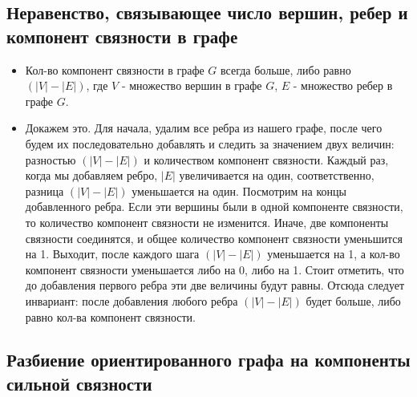 \subsection{Неравенство, связывающее число вершин, ребер и компонент связности в графе}
\begin{itemize}
\item
Кол-во компонент связности в графе $G$ всегда больше, либо равно $(|V| - |E|)$, где $V$ - множество вершин в графе $G$, $E$ - множество ребер в графе $G$.

\item
Докажем это. Для начала, удалим все ребра из нашего графе, после чего будем их последовательно добавлять и следить за значением двух величин: разностью $(|V| - |E|)$ и количеством компонент связности. Каждый раз, когда мы добавляем ребро, $|E|$ увеличивается на один, соответственно, разница $(|V| - |E|)$ уменьшается на один. Посмотрим на концы добавленного ребра. Если эти вершины были в одной компоненте связности, то количество компонент связности не изменится. Иначе, две компоненты связности соединятся, и общее количество компонент связности уменьшится на 1. Выходит, после каждого шага $(|V| - |E|)$ уменьшается на 1, а кол-во компонент связности уменьшается либо на 0, либо на 1. Стоит отметить, что до добавления первого ребра эти две величины будут равны. Отсюда следует инвариант: после добавления любого ребра $(|V| - |E|)$ будет больше, либо равно кол-ва компонент связности.
\end{itemize}

\subsection{Разбиение ориентированного графа на компоненты сильной связности}

